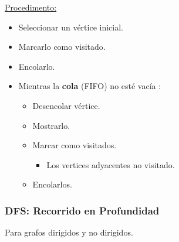\documentclass[../main.tex]{subfiles}
\begin{document}
                \underline{Procedimento:}
                \begin{itemize}
                    \item Seleccionar un vértice inicial.
                    \item Marcarlo como visitado.
                    \item Encolarlo.
                    \item Mientras la \textbf{cola} (FIFO) no esté vacía :
                        \begin{itemize}
                            \item Desencolar vértice.
                            \item Mostrarlo.
                            \item Marcar como visitados.
                                \begin{itemize}
                                    \item Los vertices adyacentes no visitado.
                                \end{itemize}
                                \item Encolarlos.
                        \end{itemize}

                \end{itemize}

            \subsubsection{DFS: Recorrido en Profundidad}
                Para grafos dirigidos y no dirigidos.\\
                
\end{document}
